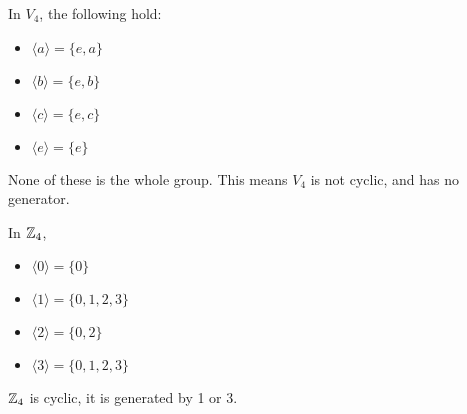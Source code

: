 \documentclass[class=article,crop=false]{standalone}
\begin{document}
\begin{eg}[]
In $V_4$, the following hold:
 \begin{itemize}
	\item $\langle a \rangle = \{e,a\} $ 
	\item $\langle b \rangle = \{e,b\} $ 
	\item $\langle c \rangle = \{e,c\} $ 
	\item $\langle e \rangle=\{e\} $
\end{itemize}
None of these is the whole group. This means $V_4$ is not cyclic, and has no generator.
\end{eg}

\begin{eg}[]
In $\mathbb{Z}_4$, 
\begin{itemize}
	\item $\langle 0 \rangle=\{0\} $ 
	\item $\langle 1 \rangle = \{0,1,2,3\} $ 
	\item $\langle 2 \rangle= \{0,2\} $ 
	\item $\langle 3 \rangle= \{0,1,2,3\} $
\end{itemize}
$\mathbb{Z}_4$ is cyclic, it is generated by 1 or 3.
\end{eg}
\end{document}
